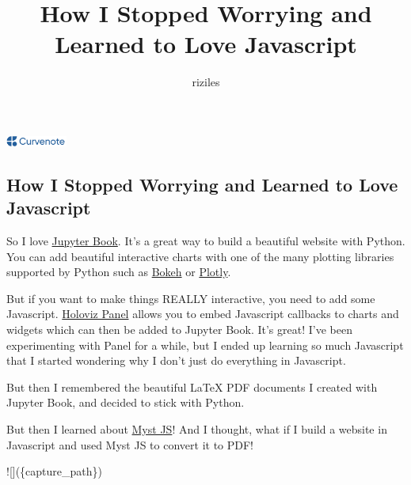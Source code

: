 \documentclass{article}
\title{How I Stopped Worrying and Learned to Love Javascript}
\author{riziles}
\date{\displaydate{articleDate}}
\newcommand{\logo}{
  \href{https://curvenote.com}{\includegraphics[width=2cm]{curvenote.png}}
}
\begin{document}
\maketitle
\begin{center}\logo\end{center}


\subsection*{How I Stopped Worrying and Learned to Love Javascript}

So I love \href{https://jupyterbook.org/en/stable/start/your-first-book.html}{Jupyter Book}.
It's a great way to build a beautiful website with Python.
You can add beautiful interactive charts with one of the many plotting libraries supported by Python
such as \href{https://bokeh.org/}{Bokeh} or \href{https://plotly.com/python/}{Plotly}.

But if you want to make things REALLY interactive, you need to add some Javascript.
\href{https://panel.holoviz.org/user_guide/Links.html#defining-javascript-callbacks}{Holoviz Panel}
allows you to embed Javascript callbacks to charts and widgets which
can then be added to Jupyter Book. It's great! I've been experimenting with Panel for a while,
but I ended up learning so much Javascript that I started wondering why I don't just do everything in Javascript.

But then I remembered the beautiful LaTeX PDF documents I created with Jupyter Book,
and decided to stick with Python.

But then I learned about \href{https://myst-tools.org/docs/mystjs}{Myst JS}! And I thought,
what if I build a website in Javascript and used Myst JS to convert it to PDF!

![](\{capture\_path\})



\end{document}
